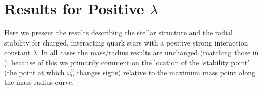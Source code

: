 \documentclass[12pt,noshowpacs,nofootinbib,notitlepage,amsmath,superscriptaddress]{revtex4-1}%
\newcommand{\mg}[1]{{\color{blue}\bf [Michael: #1]}}
\newcommand{\yb}[1]{{\color{orange}\bf [Yann: #1]}}
\begin{document}


\section{Results for Positive $\lambda$}\label{sec:resultsposlam}
Here we present the results describing the stellar structure and the radial stability for charged, interacting quark stars with a positive strong interaction constant $\lambda$.
 In all cases the mass/radius results are unchanged (matching those in \cite{zhang:2021});  because of this we primarily comment on the location of the `stability point' (the point at which $\omega_0^2$  changes signs) relative to the maximum mass point along the mass-radius curve.
 
\end{document}
